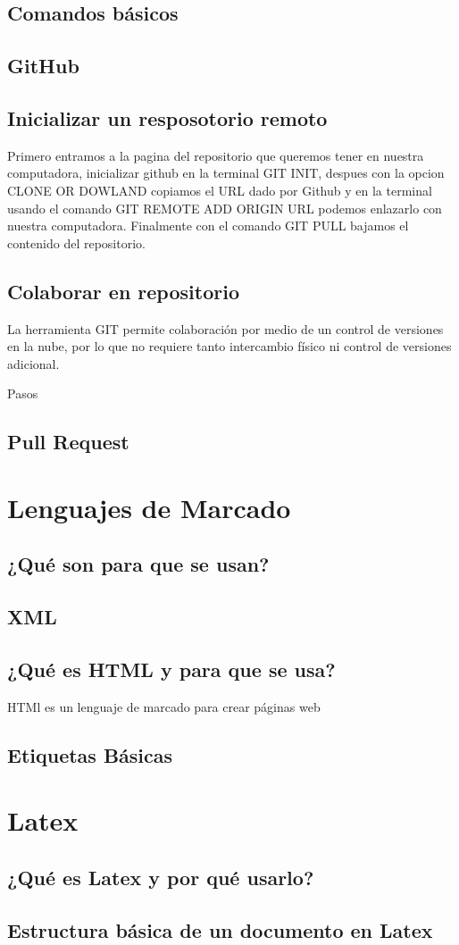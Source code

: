 \documentclass[11pt,letterpaper]{article}
\begin{document}
\subsection{Comandos básicos}

\subsection{GitHub}
\subsection{Inicializar un resposotorio remoto}

Primero entramos a la pagina del repositorio que queremos tener en nuestra computadora, inicializar github en la terminal GIT INIT, despues con la opcion CLONE OR DOWLAND copiamos el URL dado por Github y en la terminal usando el comando GIT REMOTE ADD ORIGIN URL podemos enlazarlo con nuestra computadora. Finalmente con el comando GIT PULL bajamos el contenido del repositorio.

\subsection{Colaborar en repositorio}
La herramienta GIT permite colaboración por medio de un control de versiones en la nube, por lo que no requiere tanto intercambio físico ni control de versiones adicional.

Pasos

\subsection{Pull Request}
\section{Lenguajes de Marcado}
\subsection{¿Qué son para que se usan?}
\subsection{XML}
\subsection{¿Qué es HTML y para que se usa?}
HTMl es un lenguaje de marcado para crear páginas web
\subsection{Etiquetas Básicas}
\section{Latex}
\subsection{¿Qué es Latex y por qué usarlo?}
\subsection{Estructura básica de un documento en Latex}
\end{document}
